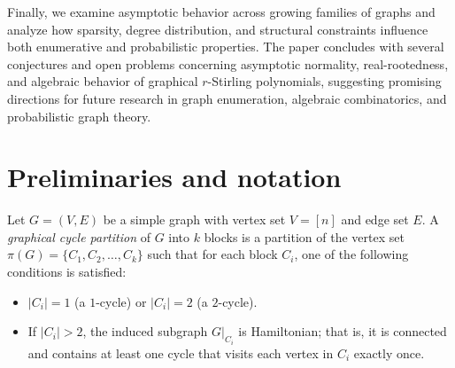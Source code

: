 \documentclass{amsart}
\theoremstyle{definition}
\begin{document}
Finally, we examine asymptotic behavior across growing families of graphs and
analyze how sparsity, degree distribution, and structural constraints influence
both enumerative and probabilistic properties. The paper concludes with several
conjectures and open problems concerning asymptotic normality, real-rootedness,
and algebraic behavior of graphical $r$-Stirling polynomials, suggesting
promising directions for future research in graph enumeration, algebraic
combinatorics, and probabilistic graph theory.
\section{Preliminaries and notation}


%


Let $G=(V,E)$ be a simple graph with vertex set $V=[n]$ and edge set $E$. A \textit{graphical cycle partition} of $G$ into $k$ blocks is a partition of the vertex set $\pi(G) = \{C_1, C_2, \dots, C_k\}$ such that for each block $C_i$, one of the following conditions is satisfied:
\begin{itemize}
	\item[(i)] $|C_i| = 1$ (a $1$-cycle) or $|C_i| = 2$ (a $2$-cycle).
	\item[(ii)] If $|C_i| > 2$, the induced subgraph $G|_{C_i}$ is Hamiltonian; that is, it is connected and contains at least one cycle that visits each vertex in $C_i$ exactly once.
\end{itemize}
\end{document}
